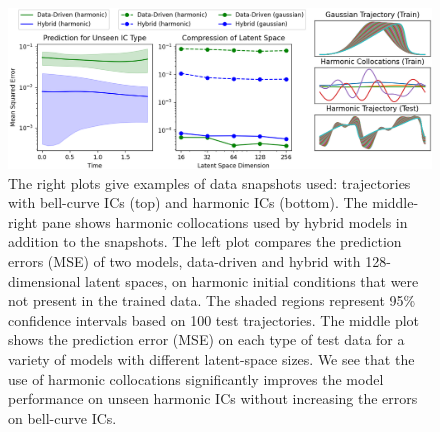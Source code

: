     \begin{figure}[t!]
        \centering
        \includegraphics[width=\textwidth]{figures/burgers_compression.png}
        \caption{The right plots give examples of data snapshots used: trajectories with bell-curve ICs (top) and harmonic ICs (bottom). The middle-right pane shows harmonic collocations used by hybrid models in addition to the snapshots. The left plot compares the prediction errors (MSE) of two models, data-driven and hybrid with 128-dimensional latent spaces, on harmonic initial conditions that were not present in the trained data. The shaded regions represent 95\% confidence intervals based on 100 test trajectories. The middle plot shows the prediction error (MSE) on each type of test data for a variety of models with different latent-space sizes. We see that the use of harmonic collocations significantly improves the model performance on unseen harmonic ICs without increasing the errors on bell-curve ICs.}
        \label{fig:pikn_burgers_compression}
    \end{figure}
    
